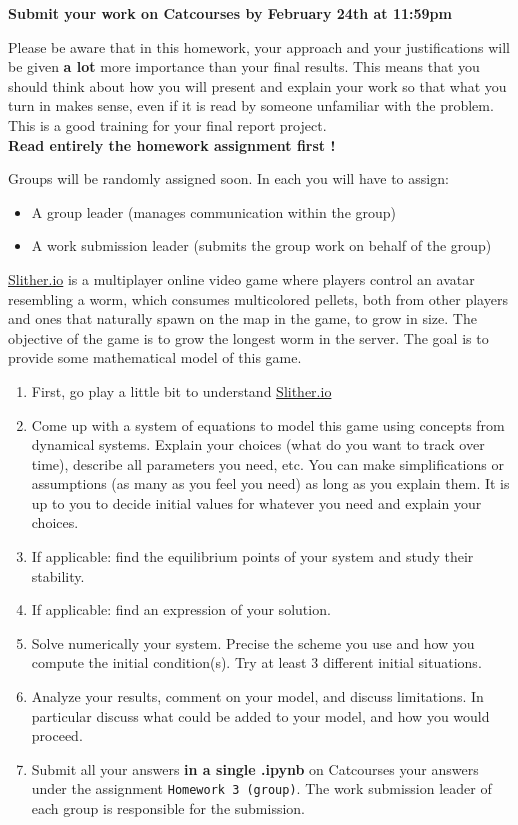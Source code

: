 \documentclass[11pt]{article}
\begin{document}
{\bf Submit your work on Catcourses by February 24th at 11:59pm}

Please be aware that in this homework, your approach and your justifications will be given {\bf a lot} more importance than your final results. This means that you should think about how you will present and explain your work so that what you turn in makes sense, even if it is read by someone unfamiliar with the problem. This is a good training for your final report project.\\
\textbf{Read entirely the homework assignment first !}

Groups will be randomly assigned soon. In each you will have to assign:
\begin{itemize}
\item A group leader (manages communication within the group)
\item A work submission leader (submits the group work on behalf of the group)
\end{itemize}

\href{http://slither.io/}{Slither.io} is a multiplayer online video game where players control an avatar resembling a worm, which consumes multicolored pellets, both from other players and ones that naturally spawn on the map in the game, to grow in size. The objective of the game is to grow the longest worm in the server. The goal is to provide some mathematical model of this game.
\begin{enumerate}
\item First, go play a little bit to understand \href{http://slither.io/}{Slither.io}
\item Come up with a system of equations to model this game using concepts from dynamical systems. Explain your choices (what do you want to track over time), describe all parameters you need, etc. You can make simplifications or assumptions (as many as you feel you need) as long as you explain them. It is up to you to decide initial values for whatever you need and explain your choices. 
\item If applicable: find the equilibrium points of your system and study their stability.
\item If applicable: find an expression of your solution.
\item Solve numerically your system. Precise the scheme you use and how you compute the initial condition(s). Try at least 3 different initial situations.
\item Analyze your results, comment on your model, and discuss limitations. In particular discuss what could be added to your model, and how you would proceed.
\item Submit all your answers \textbf{in a single .ipynb} on Catcourses your answers under the assignment \texttt{Homework 3 (group)}. The work submission leader of each group is responsible for the submission.
\end{enumerate}
\end{document}
